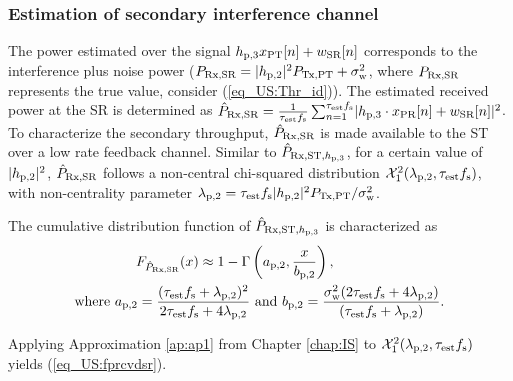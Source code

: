 \subsubsection{Estimation of secondary interference channel}
The power estimated over the signal $h_{\text{p,3}} x_{\text{PT}}[n] + w_{\text{SR}}[n]$ corresponds to the interference plus noise power ($P_{\text{Rx,SR}} = |h_{\text{p,2}}|^2 P_{\text{Tx,PT}} + \sigma^2_{\text{w}}$, where $P_{\text{Rx,SR}}$ represents the true value, consider (\ref{eq_US:Thr_id})). The estimated received power at the SR is determined as $\hat{P}_{\text{Rx,SR}} = {\frac{1}{{\tau_{\text{est}} f_{\text{s}}}}\sum_{n=1}^{\tau_{\text{est}} f_{\text{s}}}} {|h_{\text{p,3}} \cdot x_{\text{PR}}[n] + w_{\text{SR}}[n]|^2}$. To characterize the secondary throughput, $\hat{P}_{\text{Rx,SR}}$ is made available to the ST over a low rate feedback channel. Similar to $\hat{P}_{\text{Rx,ST,$h_{\text{p,3}}$}}$, for a certain value of $|h_{\text{p,2}}|^2$, $\hat{P}_{\text{Rx,SR}}$ follows a non-central chi-squared distribution $\ncchi2(\lpt, \test \fsam)$, with non-centrality parameter $\lambda_{\text{p,2}} = \tau_{\text{est}} f_{\text{s}} |h_{\text{p,2}}|^2 P_{\text{Tx,PT}} / \sigma^2_{\text{w}}$.
\begin{lemma} \label{lm_US:lm3}
\normalfont
The cumulative distribution function of $\hat{P}_{\text{Rx,ST,$h_{\text{p,3}}$}}$ is characterized as 
\begin{align}
F_{\hat{P}_{\text{Rx,SR}}}(x) \approx 1 - \Gamma&\left(a_{\text{p,2}}, \frac{x}{b_{\text{p,2}}}\right) \label{eq_US:fprcvdsr}, \\ 
\text{where  } a_{\text{p,2}} = \frac{(\tau_{\text{est}} f_{\text{s}} + \lambda_{\text{p,2}})^2}{2 \tau_{\text{est}} f_{\text{s}} + 4 \lambda_{\text{p,2}}} &\text{ and } b_{\text{p,2}} = \frac{\sigma^2_{\text{w}} (2 \tau_{\text{est}} f_{\text{s}} + 4 \lambda_{\text{p,2}})}{(\tau_{\text{est}} f_{\text{s}} + \lambda_{\text{p,2}})}.  \label{eq_US:para_pt} 
\end{align} 
\end{lemma}
\begin{IEEEproof}
Applying Approximation \ref{ap:ap1} from Chapter \ref{chap:IS} to $\ncchi2(\lpt, \test \fsam)$ yields (\ref{eq_US:fprcvdsr}). 
\end{IEEEproof}
